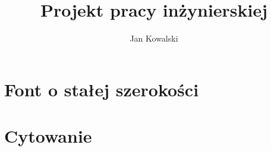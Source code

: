 \documentclass[]{wsbthesis}
\author{Jan Kowalski}
\title{Projekt pracy inżynierskiej}
\begin{document}

\maketitle{}
\printtableofcontent{}

\setcounter{page}{1}

\blinddocument{}

\chapter{Font o stałej szerokości}
 {\ttfamily\blindtext}

\chapter{Cytowanie}
\end{document}
